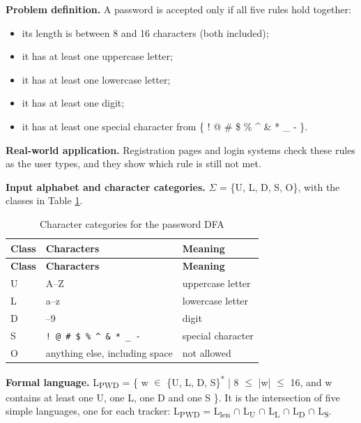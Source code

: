 \documentclass[12pt,a4paper]{article}
\begin{document}
\textbf{Problem definition.} A password is accepted only if all five rules hold together:

\begin{itemize}
\item its length is between 8 and 16 characters (both included);
\item it has at least one uppercase letter;
\item it has at least one lowercase letter;
\item it has at least one digit;
\item it has at least one special character from \{ ! @ \# \$ \% \textasciicircum{} \& * \_ - \}.
\end{itemize}

\textbf{Real-world application.} Registration pages and login systems check these rules as the user types, and they show which rule is still not met.

\textbf{Input alphabet and character categories.} \ensuremath{\Sigma} = \{U, L, D, S, O\}, with the classes in Table \ref{tab:pw_classes}.

{\small
\begin{longtable}{|>{\centering\arraybackslash}p{}|>{\raggedright\arraybackslash}p{}|>{\raggedright\arraybackslash}p{}|}
\caption[Character categories for the password DFA]{Character categories for the password DFA}\label{tab:pw_classes}\\
\hline
\rowcolor{hdr}\textbf{Class} & \textbf{Characters} & \textbf{Meaning}\\ \hline
\endfirsthead
\hline
\rowcolor{hdr}\textbf{Class} & \textbf{Characters} & \textbf{Meaning}\\ \hline
\endhead
U & A--Z & uppercase letter\\ \hline
L & a--z & lowercase letter\\ \hline
D & 0--9 & digit\\ \hline
S & \texttt{! @ \# \$ \% \textasciicircum{} \& * \_ {-}} & special character\\ \hline
O & anything else, including space & not allowed\\ \hline
\end{longtable}}

\textbf{Formal language.} L\textsubscript{PWD} = \{ w \ensuremath{\in} \{U, L, D, S\}\textsuperscript{*} | 8 \ensuremath{\leq} |w| \ensuremath{\leq} 16, and w contains at least one U, one L, one D and one S \}. It is the intersection of five simple languages, one for each tracker: L\textsubscript{PWD} = L\textsubscript{len} \ensuremath{\cap} L\textsubscript{U} \ensuremath{\cap} L\textsubscript{L} \ensuremath{\cap} L\textsubscript{D} \ensuremath{\cap} L\textsubscript{S}.
\end{document}
